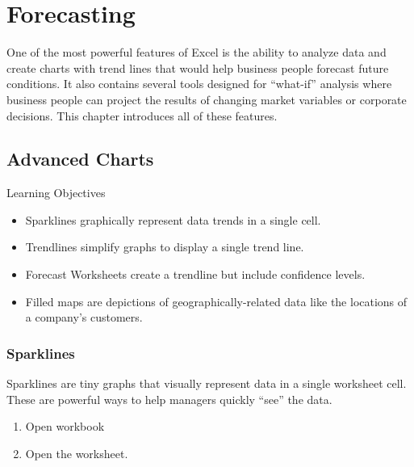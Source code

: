 \chapter{Forecasting}\label{ch08:forecasting}

One of the most powerful features of Excel is the ability to analyze data and create charts with trend lines that would help business people forecast future conditions. It also contains several tools designed for ``what-if'' analysis where business people can project the results of changing market variables or corporate decisions. This chapter introduces all of these features. 

\section{Advanced Charts}

\begin{center}
	\begin{objbox}{Learning Objectives}
		\begin{itemize}
			\setlength{\itemsep}{0pt}
			\setlength{\parskip}{0pt}
			\setlength{\parsep}{0pt}
			
			\item Sparklines graphically represent data trends in a single cell.
			\item Trendlines simplify graphs to display a single trend line.
			\item Forecast Worksheets create a trendline but include confidence levels.
			\item Filled maps are depictions of geographically-related data like the locations of a company's customers.

		\end{itemize}
	\end{objbox}
\end{center}

\subsection{Sparklines}

Sparklines are tiny graphs that visually represent data in a single worksheet cell. These are powerful ways to help managers quickly ``see'' the data.

\begin{enumerate}
	\item Open workbook 
	\item Open the  worksheet.
\end{enumerate}

